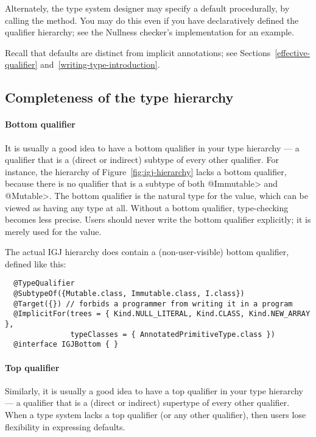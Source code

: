 Alternately, the type system designer may specify a default procedurally,
by calling the
method.  You may do this even if you have declaratively defined the
qualifier hierarchy; see the Nullness checker's implementation for an
example.


Recall that defaults are distinct
from implicit annotations; see Sections~\ref{effective-qualifier}
and~\ref{writing-type-introduction}.


\subsection{Completeness of the type hierarchy\label{bottom-qualifier}\label{top-qualifier}}

\paragraph{Bottom qualifier}
It is usually a good idea to have a bottom qualifier in your type hierarchy
--- a qualifier that is a (direct or indirect) subtype of every other
qualifier.  For instance, the hierarchy of Figure~\ref{fig:igj-hierarchy} lacks
a bottom qualifier, because there is no qualifier that is a subtype of both
\<@Immutable> and \<@Mutable>.
The bottom qualifier is the natural type for the 
value, which can be viewed as having any type at all.  Without a bottom
qualifier, type-checking becomes less precise.
Users should never write the bottom qualifier explicitly; it is merely used
for the  value.

The actual IGJ hierarchy does contain a (non-user-visible) bottom qualifier,
defined like this:

\begin{Verbatim}
  @TypeQualifier
  @SubtypeOf({Mutable.class, Immutable.class, I.class})
  @Target({}) // forbids a programmer from writing it in a program
  @ImplicitFor(trees = { Kind.NULL_LITERAL, Kind.CLASS, Kind.NEW_ARRAY },
               typeClasses = { AnnotatedPrimitiveType.class })
  @interface IGJBottom { }
\end{Verbatim}



\paragraph{Top qualifier}
Similarly, it is usually a good idea to have a top qualifier in your type
hierarchy --- a qualifier that is a (direct or indirect) supertype of every
other qualifier.  When a type system lacks a top qualifier (or any other
qualifier), then users lose flexibility in expressing defaults.

